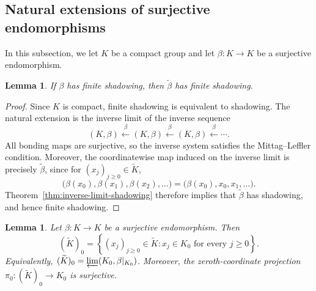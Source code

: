 \documentclass[12pt]{amsart}
\newtheorem{lemma}[theorem]{Lemma}
\theoremstyle{definition}
\numberwithin{equation}{section}
\theoremstyle{remark}
\begin{document}
\subsection{Natural extensions of surjective endomorphisms}
In this subsection, we let $K$ be a compact group and let $\beta:K\to K$ be a surjective
endomorphism. 

\begin{lemma}\label{lem:natural-extension-shadowing}
	If $\beta$ has finite shadowing, then $\widetilde\beta$ has finite
	shadowing.
\end{lemma}

\begin{proof}
	Since $K$ is compact, finite shadowing is equivalent to shadowing.
	The natural extension is the inverse limit of the inverse sequence
	\[
	(K,\beta)
	\xleftarrow{\ \beta\ }
	(K,\beta)
	\xleftarrow{\ \beta\ }
	(K,\beta)
	\xleftarrow{\ \beta\ }
	\cdots.
	\]
	All bonding maps are surjective, so the inverse system satisfies the
	Mittag--Leffler condition. Moreover, the coordinatewise map induced
	on the inverse limit is precisely $\widetilde\beta$, since for
	$(x_j)_{j\geq0}\in\widetilde K$,
	\[
	\bigl(\beta(x_0),\beta(x_1),\beta(x_2),\ldots\bigr)
	=
	\bigl(\beta(x_0),x_0,x_1,\ldots\bigr).
	\]
	Theorem~\ref{thm:inverse-limit-shadowing} therefore implies that
	$\widetilde\beta$ has shadowing, and hence finite shadowing.
\end{proof}

\begin{lemma}\label{lem:natural-extension-component}
Let $\beta:K\to K$ be a surjective endomorphism. Then
\begin{equation*}
(\widetilde K)_0
=
\left\{
(x_j)_{j\geq 0}\in\widetilde K:
x_j\in K_0 \text{ for every } j\geq 0
\right\}.
\end{equation*}
Equivalently,
$(\widetilde K)_0=\varprojlim(K_0,\beta|_{K_0})$.
Moreover, the zeroth-coordinate projection
$\pi_0:(\widetilde K)_0\to K_0$ is surjective.
\end{lemma}
\end{document}
